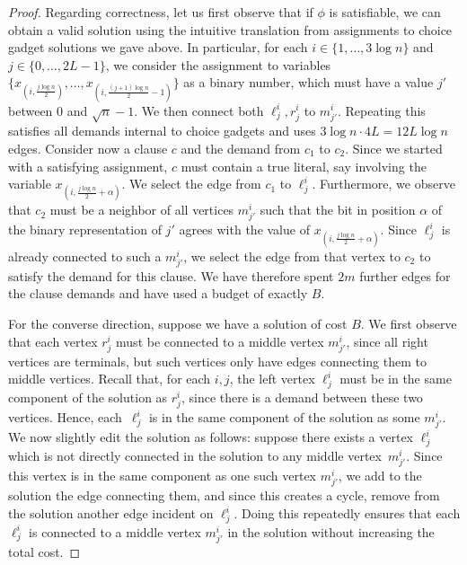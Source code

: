 \begin{proof}
Regarding correctness, let us first observe that if $\phi$ is satisfiable, we
can obtain a valid solution using the intuitive translation from assignments to
choice gadget solutions we gave above. In particular, for each
$i\in\{1,\ldots,3\log n\}$ and $j\in\{0,\ldots,2L-1\}$, we consider the
assignment to variables $\{x_{(i,\frac{j\log n}{2})},\ldots,
x_{(i,\frac{(j+1)\log n}{2}-1)}\}$ as a binary number, which must have a value
$j'$ between $0$ and $\sqrt{n}-1$. We then connect both $\ell^i_j, r^i_j$ to
$m^i_{j'}$. Repeating this satisfies all demands internal to choice gadgets and
uses $3\log n \cdot 4L = 12 L \log n$ edges. Consider now a clause $c$ and the
demand from $c_1$ to $c_2$. Since we started with a satisfying assignment, $c$
must contain a true literal, say involving the variable $x_{(i,\frac{j\log
n}{2}+\alpha)}$. We select the edge from $c_1$ to $\ell^i_{j}$. Furthermore, we
observe that $c_2$ must be a neighbor of all vertices $m^i_{j'}$ such that the
bit in position $\alpha$ of the binary representation of $j'$ agrees with the
value of $x_{(i,\frac{j\log n}{2}+\alpha)}$. Since $\ell^i_{j}$ is already
connected to such a $m^i_{j'}$, we select the edge from that vertex to $c_2$ to
satisfy the demand for this clause. We have therefore spent $2m$ further edges
for the clause demands and have used a budget of exactly $B$.

For the converse direction, suppose we have a solution of cost $B$. We first
observe that each vertex $r^i_j$ must be connected to a middle vertex
$m^i_{j'}$, since all right vertices are terminals, but such vertices only have
edges connecting them to middle vertices. Recall that, for each $i,j$, the left
vertex $\ell^i_j$ must be in the same component of the solution as $r^i_j$,
since there is a demand between these two vertices. Hence, each~$\ell^i_j$ is
in the same component of the solution as some $m^i_{j'}$. We now slightly edit
the solution as follows: suppose there exists a vertex $\ell^i_j$ which is not
directly connected in the solution to any middle vertex~$m^i_{j'}$. Since this
vertex is in the same component as one such vertex $m^i_{j'}$, we add to the
solution the edge connecting them, and since this creates a cycle, remove from
the solution another edge incident on $\ell^i_j$. Doing this repeatedly ensures
that each $\ell^i_j$ is connected to a middle vertex $m^i_{j'}$ in the solution
without increasing the total cost.


\end{proof}
